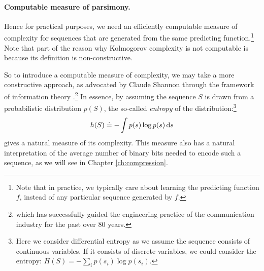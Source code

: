 \documentclass[../../book-main.tex]{subfiles}
\begin{document}
\paragraph{Computable measure of parsimony.}
Hence for practical purposes, we need an efficiently computable measure of complexity for sequences that are generated from the same predicting function.\footnote{Note that in practice, we typically care about learning the predicting function $f$, instead of any particular sequence generated by $f$.} Note that part of the reason why Kolmogorov complexity is not computable is because its definition is non-constructive.

So to introduce a computable measure of complexity, we may take a more constructive approach, as advocated by Claude Shannon through the framework of information theory \cite{Shannon-1948,Cover-Thomas}.\footnote{which has successfully guided the engineering practice of the communication industry for the past over 80 years.} In essence, by assuming the sequence $S$ is drawn from a probabilistic distribution $p(S)$, the so-called {\em entropy} of the distribution:\footnote{Here we consider differential entropy as we assume the sequence consists of continuous variables. If it consists of discrete variables, we could consider the entropy: $H(S) = - \sum_{i}p(s_i) \log p(s_i).$ }
\begin{equation}
    h(S) \doteq -\int p(s) \log p(s) \odif{s}
    \label{eqn:entropy-definition}
\end{equation}
gives a natural measure of its complexity. This measure also has a natural interpretation of the average number of binary bits needed to encode such a sequence, as we will see in Chapter \ref{ch:compression}.
\end{document}
